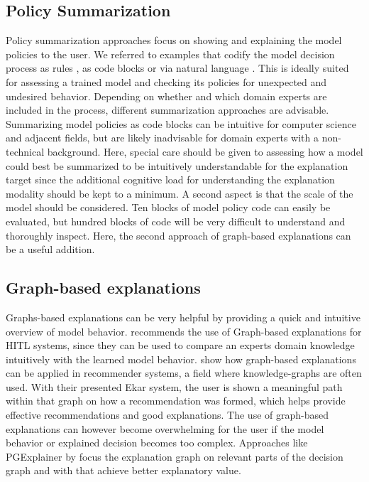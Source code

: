 \documentclass[twoside,11pt]{article}
\begin{document}
\subsection{Policy Summarization}
Policy summarization approaches focus on showing and explaining the model policies to the user. We referred to examples that codify the model decision process as rules \cite{LiuEtAl:2018:LinearModelUTrees}, as code blocks \cite{VermaEtAl:2018:ProgrammaticallyInterpretableRL} or via natural language \cite{AlonsoEtAl:2018:xAINLBeerClassifier}. 
This is ideally suited for assessing a trained model and checking its policies for unexpected and undesired behavior. Depending on whether and which domain experts are included in the process, different summarization approaches are advisable. Summarizing model policies as code blocks can be intuitive for computer science and adjacent fields, but are likely inadvisable for domain experts with a non-technical background. Here, special care should be given to assessing how a model could best be summarized to be intuitively understandable for the explanation target since the additional cognitive load for understanding the explanation modality should be kept to a minimum.
A second aspect is that the scale of the model should be considered. Ten blocks of model policy code can easily be evaluated, but hundred blocks of code will be very difficult to understand and thoroughly inspect. Here, the second approach of graph-based explanations can be a useful addition.

\subsection{Graph-based explanations}

Graphs-based explanations can be very helpful by providing a quick and intuitive overview of model behavior. \cite{Holzinger:2016:iML} recommends the use of Graph-based explanations for HITL systems, since they can be used to compare an experts domain knowledge intuitively with the learned model behavior. \cite{SongEtAl:2019:ExplainableGraphBasedRecommendations} show how graph-based explanations can be applied in recommender systems, a field where knowledge-graphs are often used. With their presented Ekar system, the user is shown a meaningful path within that graph on how a recommendation was formed, which helps provide effective recommendations and good explanations.
The use of graph-based explanations can however become overwhelming for the user if the model behavior or explained decision becomes too complex. Approaches like PGExplainer by \cite{Vu:2020:PGMExplainer} focus the explanation graph on relevant parts of the decision graph and with that achieve better explanatory value.
\end{document}

